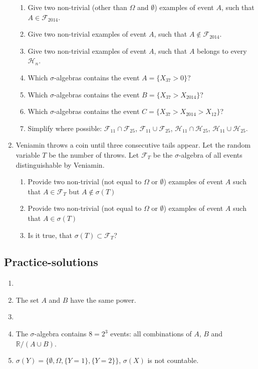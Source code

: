 \documentclass[12pt, a4paper]{article}
\newcommand{\RR}{\mathbb{R}}
\newcommand{\cF}{\mathcal{F}}
\begin{document}
\begin{enumerate}
\begin{enumerate}
\item Give two non-trivial (other  than $ \Omega $ and $ \emptyset $) examples of event $ A $, such that $ A\in \cF_{2014} $.
\item Give two non-trivial examples of event $ A $, such that $ A\notin \cF_{2014} $.
\item Give two non-trivial examples of event $ A $, such that $A$ belongs to every $\mathcal{H}_{n}$.
\item Which $ \sigma $-algebras contains the event $ A= \{ X_{37}>0\}$?
\item Which $ \sigma $-algebras contains the event $ B=\{ X_{37}>X_{2014} \}$?
\item Which $ \sigma $-algebras contains the event $ C= \{X_{37}>X_{2014}>X_{12}\}$?
\item Simplify where possible: $ \cF_{11}\cap \cF_{25} $, $ \cF_{11}\cup \cF_{25} $, $ \mathcal{H}_{11}\cap \mathcal{H}_{25} $, $ \mathcal{H}_{11}\cup \mathcal{H}_{25} $.
\end{enumerate}

\item Veniamin throws a coin until three consecutive tails appear.  Let the random variable $T$ be the number of throws. Let $ \cF_{T} $ be the $ \sigma $-algebra of all events distinguishable by Veniamin.
\begin{enumerate}
\item Provide two non-trivial (not equal to $\Omega$ or $\emptyset$) examples of event $A$ such that $A\in  \cF_{T}$ but $A\notin \sigma(T)$
\item Provide two non-trivial (not equal to $\Omega$ or $\emptyset$) examples of event $A$ such that $A\in  \sigma(T)$
\item Is it true, that $\sigma(T) \subset \cF_{T}$?
\end{enumerate}

\end{enumerate}

\subsection{Practice-solutions}

\begin{enumerate}
\item
\item The set $A$ and $B$ have the same power.
\item
\item The $\sigma$-algebra contains $8=2^3$ events: all combinations of $A$, $B$ and $\RR/(A\cup B)$.
\item $\sigma(Y)=\{ \emptyset, \Omega, \{Y=1\}, \{Y=2\} \}$, $\sigma(X)$ is not countable.
\end{enumerate}
\end{document}
